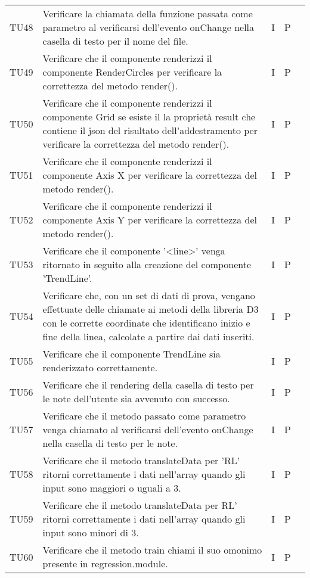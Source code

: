 \begin{longtable} {
		>{}p{15mm} 
		>{}p{79.5mm}
		>{}p{15mm} 
		>{}p{15mm}
		>{}p{0mm}}
	TU48    	& Verificare la chiamata della funzione passata come parametro al verificarsi dell'evento onChange nella casella di testo per il nome del file. & I & P &\TBstrut \\ [2mm]
	TU49		& Verificare che il componente renderizzi il componente RenderCircles per verificare la correttezza del metodo render().& I & P &\TBstrut \\ [2mm]
	TU50		& Verificare che il componente renderizzi il componente Grid se esiste il la proprietà result che contiene il json del risultato dell'addestramento per verificare la correttezza del metodo render().& I & P &\TBstrut \\ [2mm]
	TU51		& Verificare che il componente renderizzi il componente Axis X per verificare la correttezza del metodo render().& I & P &\TBstrut \\ [2mm]
	TU52		& Verificare che il componente renderizzi il componente Axis Y per verificare la correttezza del metodo render().& I & P &\TBstrut \\ [2mm]
	TU53	    & Verificare che il componente '<line>' venga ritornato in seguito alla creazione del componente 'TrendLine'. & I & P &\TBstrut \\ [2mm]
	TU54    	& Verificare che, con un set di dati di prova, vengano effettuate delle chiamate ai metodi della libreria D3 con le corrette coordinate che identificano inizio e fine della linea, calcolate a partire dai dati inseriti. & I & P &\TBstrut \\ [2mm]
    TU55		& Verificare che il componente TrendLine sia renderizzato correttamente. & I & P &\TBstrut \\ [2mm]
	TU56    	& Verificare che il rendering della casella di testo per le note dell'utente sia avvenuto con successo. & I & P &\TBstrut \\ [2mm]
	TU57    	& Verificare che il metodo passato come parametro venga chiamato al verificarsi dell'evento onChange nella casella di testo per le note. & I & P &\TBstrut \\ [2mm]
	TU58		& Verificare che il metodo translateData per 'RL\glo' ritorni correttamente i dati nell'array quando gli input sono maggiori o uguali a 3.& I & P &\TBstrut \\ [2mm]
	TU59		& Verificare che il metodo translateData per RL\glo' ritorni correttamente i dati nell'array quando gli input sono minori di 3.& I & P &\TBstrut \\ [2mm]
	TU60		& Verificare che il metodo train chiami il suo omonimo presente in regression.module. & I & P &\TBstrut \\ [2mm]

\end{longtable}
